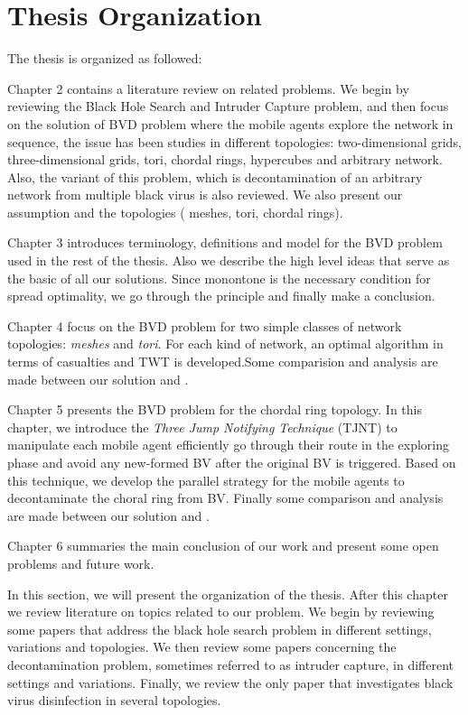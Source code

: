
\section{Thesis Organization} 

The thesis is organized as followed:

Chapter 2 contains a literature review on related problems. We begin by reviewing the Black Hole Search and Intruder Capture problem, and then focus on the solution of BVD problem where the mobile agents explore the network in sequence, the issue has been studies in different topologies: two-dimensional grids, three-dimensional grids, tori, chordal rings, hypercubes and arbitrary network. Also, the variant of this problem, which is decontamination of an arbitrary network from multiple black virus is also reviewed. We also present our assumption and the topologies ( meshes, tori, chordal rings).

Chapter 3 introduces terminology, definitions and model for the BVD problem used in the rest of the thesis. Also we describe the high level ideas that serve as the basic of all our solutions. Since monontone is the necessary condition for spread optimality, we go through the principle and finally make a conclusion.

Chapter 4 focus on the BVD problem for two simple classes of network topologies: {\em meshes} and {\em tori}. For each kind of network, an optimal algorithm in terms of casualties and TWT is developed.Some comparision and analysis are made between our solution and \cite{Cai}.

Chapter 5 presents the BVD problem for the chordal ring topology. In this chapter, we introduce the {\em Three Jump Notifying Technique} (TJNT) to manipulate each mobile agent efficiently go through their route in the exploring phase and avoid any new-formed BV after the original BV is triggered. Based on this technique, we develop the parallel strategy for the mobile agents to decontaminate the choral ring from BV. Finally some comparison and analysis are made between our solution and \cite{Alotaibi}.

Chapter 6 summaries the main conclusion of our work and present some open problems and future work.
  
  
In this section, we will present the organization of the thesis. After this chapter we review literature on topics related to our problem. We begin by reviewing some papers that address the black hole search problem in different settings, variations and topologies. We then review some papers concerning the decontamination problem, sometimes referred to as intruder capture, in different settings and variations. Finally, we review the only paper that investigates black virus disinfection in several topologies.

